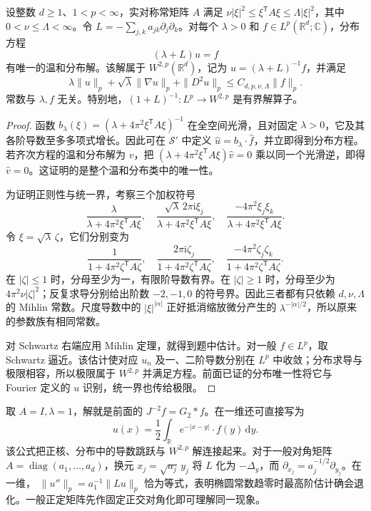 \begin{proposition}[带正参数的椭圆预解算子]\label{b2:prop:22-elliptic-resolvent}
设整数 \(d\geq1\)、\(1<p<\infty\)，实对称常矩阵 \(A\) 满足
\(\nu|\xi|^2\leq\xi^{\mathsf T}A\xi\leq\Lambda|\xi|^2\)，其中
\(0<\nu\leq\Lambda<\infty\)。令
\(L=-\sum_{j,k}a_{jk}\partial_j\partial_k\)。对每个 \(\lambda>0\) 和
\(f\in L^p(\mathbb R^d;\mathbb C)\)，分布方程
\[
 (\lambda+L)u=f
\]
有唯一的温和分布解。该解属于 \(W^{2,p}(\mathbb R^d)\)，记为
\(u=(\lambda+L)^{-1}f\)，并满足
\[
 \lambda\|u\|_p+\sqrt\lambda\|\nabla u\|_p+\|D^2u\|_p
 \leq C_{d,p,\nu,\Lambda}\|f\|_p.
\]
常数与 \(\lambda,f\) 无关。特别地，\((1+L)^{-1}:L^p\to W^{2,p}\) 是有界解算子。
\end{proposition}
\begin{proof}
函数 \(b_\lambda(\xi)=(\lambda+4\pi^2\xi^{\mathsf T}A\xi)^{-1}\) 在全空间光滑，且对固定 \(\lambda>0\)，它及其各阶导数至多多项式增长。因此可在 \(\mathcal S'\) 中定义
\(\widehat u=b_\lambda\cdot\widehat f\)，并立即得到分布方程。若齐次方程的温和分布解为 \(v\)，把
\((\lambda+4\pi^2\xi^{\mathsf T}A\xi)\widehat v=0\)
乘以同一个光滑逆，即得 \(\widehat v=0\)。这证明的是整个温和分布类中的唯一性。

为证明正则性与统一界，考察三个加权符号
\[
 \frac{\lambda}{\lambda+4\pi^2\xi^{\mathsf T}A\xi},\quad
 \frac{\sqrt\lambda\,2\pi\mathrm i\xi_j}
      {\lambda+4\pi^2\xi^{\mathsf T}A\xi},\quad
 \frac{-4\pi^2\xi_j\xi_k}
      {\lambda+4\pi^2\xi^{\mathsf T}A\xi}.
\]
令 \(\xi=\sqrt\lambda\,\zeta\)，它们分别变为
\[
 \frac1{1+4\pi^2\zeta^{\mathsf T}A\zeta},\quad
 \frac{2\pi\mathrm i\zeta_j}{1+4\pi^2\zeta^{\mathsf T}A\zeta},\quad
 \frac{-4\pi^2\zeta_j\zeta_k}{1+4\pi^2\zeta^{\mathsf T}A\zeta}.
\]
在 \(|\zeta|\leq1\) 时，分母至少为一，有限阶导数有界。在
\(|\zeta|\geq1\) 时，分母至少为 \(4\pi^2\nu|\zeta|^2\)；反复求导分别给出阶数 \(-2,-1,0\) 的符号界。因此三者都有只依赖
\(d,\nu,\Lambda\) 的 Mihlin 常数。尺度导数中的
\(|\xi|^{|\alpha|}\) 正好抵消缩放微分产生的
\(\lambda^{-|\alpha|/2}\)，所以原来的参数族有相同常数。

对 Schwartz 右端应用 Mihlin 定理，就得到题中估计。对一般
\(f\in L^p\)，取 Schwartz 逼近。该估计使对应 \(u_n\) 及一、二阶导数分别在 \(L^p\) 中收敛；分布求导与极限相容，所以极限属于 \(W^{2,p}\) 并满足方程。前面已证的分布唯一性将它与 Fourier 定义的 \(u\) 识别，统一界也传给极限。
\end{proof}
取 \(A=I,\lambda=1\)，解就是前面的 \(J^{-2}f=G_2*f\)。在一维还可直接写为
\[
 u(x)=\frac12\int_{\mathbb R}e^{-|x-y|}\cdot f(y)\,\mathrm dy.
\]
该公式把正核、分布中的导数跳跃与 \(W^{2,p}\) 解连接起来。对于一般对角矩阵
\(A=\operatorname{diag}(a_1,\ldots,a_d)\)，换元
\(x_j=\sqrt{a_j}\,y_j\) 将 \(L\) 化为 \(-\Delta_y\)，而
\(\partial_{x_j}=a_j^{-1/2}\partial_{y_j}\)。在一维，
\(\|u''\|_p=a_1^{-1}\|Lu\|_p\) 恰为等式，表明椭圆常数趋零时最高阶估计确会退化。一般正定矩阵先作固定正交对角化即可理解同一现象。

